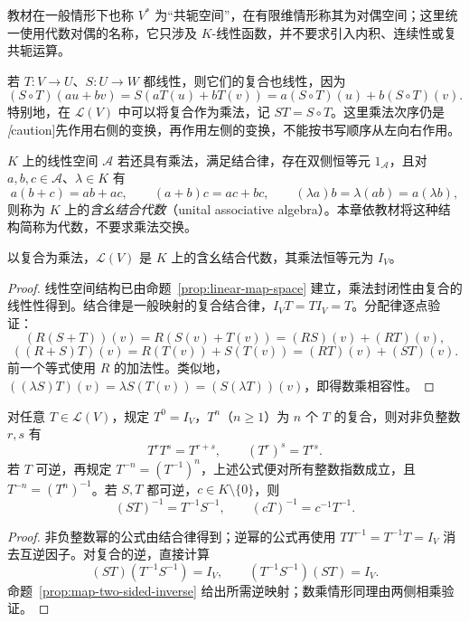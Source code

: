 教材在一般情形下也称 $V^*$ 为“共轭空间”，在有限维情形称其为对偶空间；这里统一使用代数对偶的名称，它只涉及 $K$-线性函数，并不要求引入内积、连续性或复共轭运算。

若 $T:V\to U$、$S:U\to W$ 都线性，则它们的复合也线性，因为
\[
    (S\circ T)(au+bv)
    =S(aT(u)+bT(v))
    =a(S\circ T)(u)+b(S\circ T)(v).
\]
特别地，在 $\mathcal L(V)$ 中可以将复合作为乘法，记 $ST=S\circ T$。这里乘法次序仍是\emph[caution]{先作用右侧的变换，再作用左侧的变换}，不能按书写顺序从左向右作用。

\begin{definition}
\label{def:associative-unital-algebra}
$K$ 上的线性空间 $\mathcal A$ 若还具有乘法，满足结合律，存在双侧恒等元 $1_{\mathcal A}$，且对 $a,b,c\in\mathcal A$、$\lambda\in K$ 有
\[
    a(b+c)=ab+ac,\qquad (a+b)c=ac+bc,
    \qquad (\lambda a)b=\lambda(ab)=a(\lambda b),
\]
则称为 $K$ 上的\emph{含幺结合代数}（unital associative algebra）。本章依教材将这种结构简称为代数，不要求乘法交换。
\end{definition}

\begin{theorem}
\label{thm:endomorphism-algebra}
以复合为乘法，$\mathcal L(V)$ 是 $K$ 上的含幺结合代数，其乘法恒等元为 $I_V$。
\end{theorem}

\begin{proof}
线性空间结构已由命题~\ref{prop:linear-map-space} 建立，乘法封闭性由复合的线性性得到。结合律是一般映射的复合结合律，$I_VT=TI_V=T$。分配律逐点验证：
\[
    (R(S+T))(v)=R(S(v)+T(v))=(RS)(v)+(RT)(v),
\]
\[
    ((R+S)T)(v)=R(T(v))+S(T(v))=(RT)(v)+(ST)(v).
\]
前一个等式使用 $R$ 的加法性。类似地，$((\lambda S)T)(v)=\lambda S(T(v))=(S(\lambda T))(v)$，即得数乘相容性。
\end{proof}

\begin{proposition}
\label{prop:linear-map-powers}
对任意 $T\in\mathcal L(V)$，规定 $T^0=I_V$，$T^n$（$n\geq1$）为 $n$ 个 $T$ 的复合，则对非负整数 $r,s$ 有
\[
    T^rT^s=T^{r+s},\qquad (T^r)^s=T^{rs}.
\]
若 $T$ 可逆，再规定 $T^{-n}=(T^{-1})^n$，上述公式便对所有整数指数成立，且 $T^{-n}=(T^n)^{-1}$。若 $S,T$ 都可逆，$c\in K\setminus\{0\}$，则
\[
    (ST)^{-1}=T^{-1}S^{-1},\qquad (cT)^{-1}=c^{-1}T^{-1}.
\]
\end{proposition}

\begin{proof}
非负整数幂的公式由结合律得到；逆幂的公式再使用 $TT^{-1}=T^{-1}T=I_V$ 消去互逆因子。对复合的逆，直接计算
\[
    (ST)(T^{-1}S^{-1})=I_V,
    \qquad (T^{-1}S^{-1})(ST)=I_V.
\]
命题~\ref{prop:map-two-sided-inverse} 给出所需逆映射；数乘情形同理由两侧相乘验证。
\end{proof}

